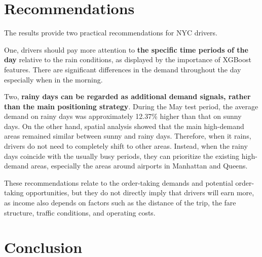 \documentclass[11pt]{article}
\begin{document}

\section{Recommendations}

The results provide two practical recommendations for NYC drivers.

One, drivers should pay more attention to \textbf{the specific time periods of the day} relative to the rain conditions, as displayed by the importance of XGBoost features. There are significant differences in the demand throughout the day especially when in the morning.

Two, \textbf{rainy days can be regarded as additional demand signals, rather than the main positioning strategy}. During the May test period, the average demand on rainy days was approximately 12.37\% higher than that on sunny days. On the other hand, spatial analysis showed that the main high-demand areas remained similar between sunny and rainy days. Therefore, when it rains, drivers do not need to completely shift to other areas. Instead, when the rainy days coincide with the usually busy periods, they can prioritize the existing high-demand areas, especially the areas around airports in Manhattan and Queens.

These recommendations relate to the order-taking demands and potential order-taking opportunities, but they do not directly imply that drivers will earn more, as income also depends on factors such as the distance of the trip, the fare structure, traffic conditions, and operating costs.



\section{Conclusion}
\end{document}
